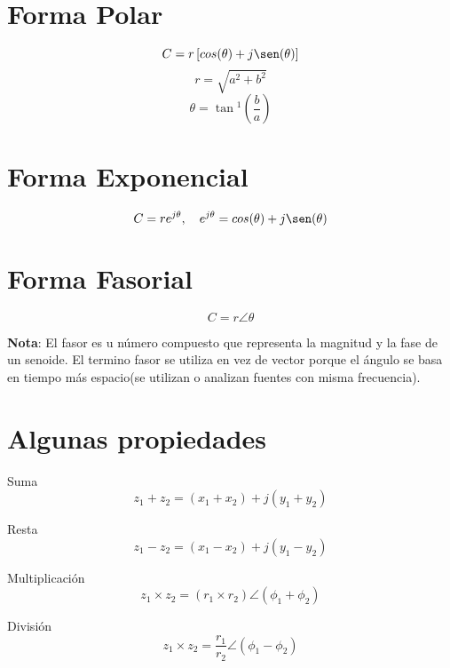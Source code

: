 \section*{Forma Polar}
\begin{equation*}
  C = r\left[cos(\theta) + j\sen(\theta)\right]
\end{equation*}
\begin{equation*}
  r = \sqrt{a^2 + b^2}
\end{equation*}
\begin{equation*}
  \theta = \tan{^1}\left(\frac{b}{a}\right)
\end{equation*}

\section*{Forma Exponencial}
\begin{equation*}
  C = r e^{j\theta},\quad e^{j\theta} = cos(\theta) + j\sen(\theta)
\end{equation*}

\section*{Forma Fasorial}
\begin{equation*}
  C = r \angle \theta
\end{equation*}

\textbf{Nota}: El fasor es u número compuesto que representa la magnitud y la
fase de un senoide. El termino fasor se utiliza en vez de vector porque el
ángulo se basa en tiempo más espacio(se utilizan o analizan fuentes con misma
frecuencia).

\section{Algunas propiedades}
Suma
\begin{equation*}
  z_1 + z_2 = (x_1 + x_2) + j(y_1 + y_2)
\end{equation*}

Resta
\begin{equation*}
  z_1 - z_2 = (x_1 - x_2) + j(y_1 - y_2)
\end{equation*}

Multiplicación
\begin{equation*}
  z_1 \times z_2 = (r_1 \times r_2) \angle (\phi_1 + \phi_2)
\end{equation*}

División
\begin{equation*}
  z_1 \times z_2 = \frac{r_1}{r_2} \angle (\phi_1 - \phi_2)
\end{equation*}


